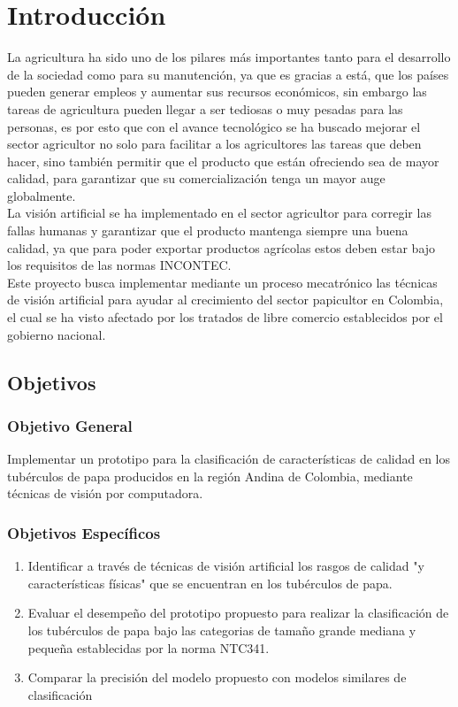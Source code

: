 \cleardoublepage %

\chapter{Introducción}

La agricultura ha sido uno de los pilares más importantes tanto para el desarrollo de la sociedad como para su manutención, ya que es gracias a está, que los países pueden generar empleos y aumentar sus recursos económicos, sin embargo las tareas de agricultura pueden llegar a ser tediosas o muy pesadas para las personas, es por esto que con el avance tecnológico se ha buscado mejorar el sector agricultor no solo para facilitar a los agricultores las tareas que deben hacer, sino también permitir que el producto que están ofreciendo sea de mayor calidad, para garantizar que su comercialización tenga un mayor auge globalmente.
\\
La visión artificial se ha implementado en el sector agricultor para corregir las fallas humanas y garantizar que el producto mantenga siempre una buena calidad, ya que para poder exportar productos agrícolas estos deben estar bajo los requisitos de las normas INCONTEC.
\\
Este proyecto busca implementar mediante un proceso mecatrónico las técnicas de visión artificial para ayudar al crecimiento del sector papicultor en Colombia, el cual se ha visto afectado por los tratados de libre comercio establecidos por el gobierno nacional. 


\newpage
\section{Objetivos}

\subsection{Objetivo General}

Implementar un prototipo para la clasificación de características de calidad en los tubérculos de papa producidos en la región Andina de Colombia, mediante técnicas de visión por computadora.

\subsection{Objetivos Específicos}
\begin{enumerate}
	\item Identificar a través de técnicas de visión artificial los rasgos de calidad "y características físicas" que se encuentran en los tubérculos de papa. 
	\item Evaluar el desempeño del prototipo propuesto para realizar la clasificación de los tubérculos de papa bajo las categorias de tamaño grande mediana y pequeña establecidas por la norma NTC341. 
	\item Comparar la precisión del modelo propuesto con modelos similares de clasificación
\end{enumerate}

